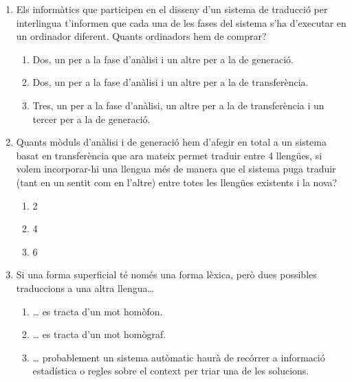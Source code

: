 \begin{enumerate}
\item Els informàtics que participen en el disseny d'un sistema de
  traducció per interlingua t'informen que cada una de les fases del
  sistema s'ha d'executar en un ordinador diferent. Quants ordinadors
  hem de comprar?
  \begin{enumerate}
  \item Dos, un per a la fase d'anàlisi i un altre per a la de
    generació.
  \item Dos, un per a la fase d'anàlisi i un altre per a la de
    transferència.
  \item Tres, un per a la fase d'anàlisi, un altre per a la de
    transferència i un tercer per a la de generació.
  \end{enumerate}

\item Quants mòduls d'anàlisi i de generació hem d'afegir en total a
  un sistema basat en transferència que ara mateix permet traduir
  entre 4 llengües, si volem incorporar-hi una llengua més de manera
  que el sistema puga traduir (tant en un sentit com en l'altre) entre
  totes les llengües existents i la nova?
  \begin{enumerate}
  \item 2
  \item 4
  \item 6
  \end{enumerate}

\item Si una forma superficial té només una forma lèxica, però dues
  possibles traduccions a una altra llengua{\ldots}   
  \begin{enumerate}
  \item {\ldots} es tracta d'un mot homòfon.
  \item {\ldots} es tracta d'un mot homògraf.
  \item {\ldots} probablement un sistema autòmatic haurà de recórrer a
    informació estadística o regles sobre el context per triar una de
    les solucions.
  \end{enumerate}


\end{enumerate}
